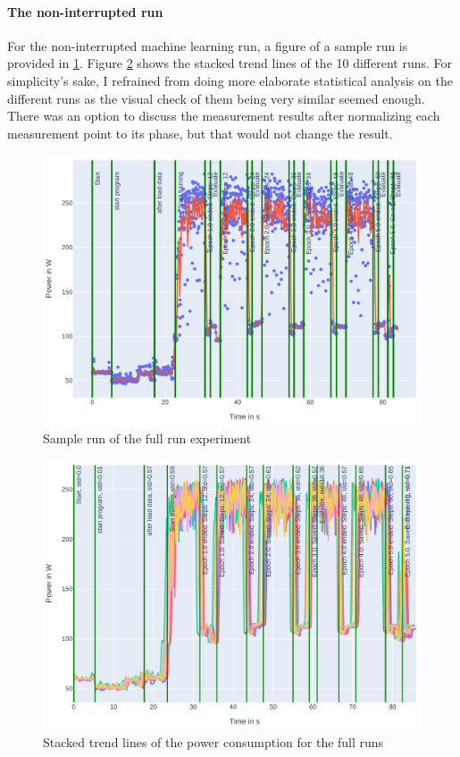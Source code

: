 \paragraph{The non-interrupted run}

For the non-interrupted machine learning run, a figure of a sample run is provided in \ref{fig:plot_full}. 
Figure \ref{fig:plot_full_stacked} shows the stacked trend lines of the 10 different runs.
For simplicity's sake, I refrained from doing more elaborate statistical analysis on the different runs as the visual check of them being very similar seemed enough. 
There was an option to discuss the measurement results after normalizing each measurement point to its phase, but that would not change the result.

\begin{figure}
    \includegraphics[width=\linewidth]{power-measurements/measurements_roberta_full_0714010405/plot.pdf}
    \caption{Sample run of the full run experiment}
    \label{fig:plot_full}
\end{figure}

\begin{figure}
    \includegraphics[width=\linewidth]{power-measurements/stacked_plots/roberta_full_0714.pdf}
    \caption{Stacked trend lines of the power consumption for the full runs}
    \label{fig:plot_full_stacked}
\end{figure}

